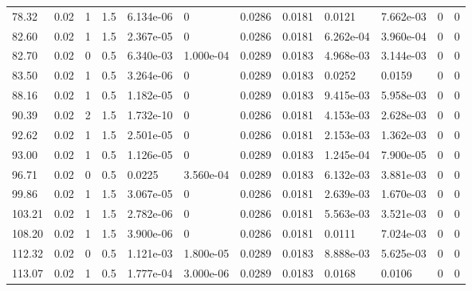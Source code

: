 \documentclass[preview]{standalone}
\begin{document}
{{\begin{tabular}{L{1.2cm}C{1.2cm} C{0.3cm}C{0.5cm} C{1.4cm}C{1.4cm} C{1.4cm}C{1.4cm} C{1.6cm}C{1.6cm} C{1.6cm}C{1.6cm}}
  78.32  &  0.02  & 1     & 1.5 &  6.134e-06  & 0  &  0.0286&   0.0181& 0.0121 & 7.662e-03   &  0 & 0  \\ 
  82.60  &  0.02  & 1     & 1.5 &  2.367e-05  & 0  &  0.0286&   0.0181& 6.262e-04 & 3.960e-04   &  0 & 0  \\ 
  82.70  &  0.02  & 0     & 0.5 &  6.340e-03  & 1.000e-04  &  0.0289&   0.0183& 4.968e-03 & 3.144e-03   &  0 & 0  \\ 
  83.50  &  0.02  & 1     & 0.5 &  3.264e-06  & 0  &  0.0289&   0.0183& 0.0252 & 0.0159   &  0 & 0  \\ 
  88.16  &  0.02  & 1     & 0.5 &  1.182e-05  & 0  &  0.0289&   0.0183& 9.415e-03 & 5.958e-03   &  0 & 0  \\ 
  90.39  &  0.02  & 2     & 1.5 &  1.732e-10  & 0  &  0.0286&   0.0181& 4.153e-03 & 2.628e-03   &  0 & 0  \\ 
  92.62  &  0.02  & 1     & 1.5 &  2.501e-05  & 0  &  0.0286&   0.0181& 2.153e-03 & 1.362e-03   &  0 & 0  \\ 
  93.00  &  0.02  & 1     & 0.5 &  1.126e-05  & 0  &  0.0289&   0.0183& 1.245e-04 & 7.900e-05   &  0 & 0  \\ 
  96.71  &  0.02  & 0     & 0.5 &  0.0225  & 3.560e-04  &  0.0289&   0.0183& 6.132e-03 & 3.881e-03   &  0 & 0  \\ 
  99.86  &  0.02  & 1     & 1.5 &  3.067e-05  & 0  &  0.0286&   0.0181& 2.639e-03 & 1.670e-03   &  0 & 0  \\ 
  103.21  &  0.02  & 1     & 1.5 &  2.782e-06  & 0  &  0.0286&   0.0181& 5.563e-03 & 3.521e-03   &  0 & 0  \\ 
  108.20  &  0.02  & 1     & 1.5 &  3.900e-06  & 0  &  0.0286&   0.0181& 0.0111 & 7.024e-03   &  0 & 0  \\ 
  112.32  &  0.02  & 0     & 0.5 &  1.121e-03  & 1.800e-05  &  0.0289&   0.0183& 8.888e-03 & 5.625e-03   &  0 & 0  \\ 
  113.07  &  0.02  & 1     & 0.5 &  1.777e-04  & 3.000e-06  &  0.0289&   0.0183& 0.0168 & 0.0106   &  0 & 0  \\ 
\hline 
\end{tabular} 

}}
\end{document}
